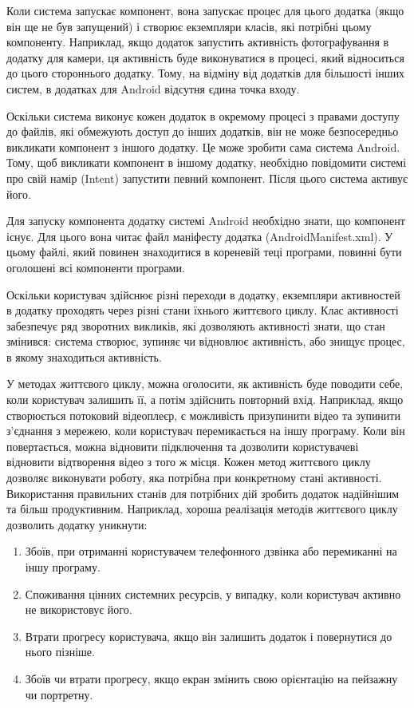 \documentclass[../main.tex]{subfiles}
\begin{document}
Коли система запускає компонент, вона запускає процес для цього додатка (якщо він ще не був запущений) і створює екземпляри класів, які потрібні цьому компоненту. Наприклад, якщо додаток запустить активність фотографування в додатку для камери, ця активність буде виконуватися в процесі, який відноситься до цього стороннього додатку. Тому, на відміну від додатків для більшості інших систем, в додатках для Android відсутня єдина точка входу.

Оскільки система виконує кожен додаток в окремому процесі з правами доступу до файлів, які обмежують доступ до інших додатків, він не може безпосередньо викликати компонент з іншого додатку. Це може зробити сама система Android. Тому, щоб викликати компонент в іншому додатку, необхідно повідомити системі про свій намір (Intent) запустити певний компонент. Після цього система активує його.

Для запуску компонента додатку системі Android необхідно знати, що компонент існує. Для цього вона читає файл маніфесту додатка (AndroidManifest.xml). У цьому файлі, який повинен знаходитися в кореневій теці програми, повинні бути оголошені всі компоненти програми.

Оскільки користувач здійснює різні переходи в додатку, екземпляри активностей в додатку проходять через різні стани їхнього життєвого циклу. Клас активності забезпечує ряд зворотних викликів, які дозволяють активності знати, що стан змінився: система створює, зупиняє чи відновлює активність, або знищує процес, в якому знаходиться активність.

У методах життєвого циклу, можна оголосити, як активність буде поводити себе, коли користувач залишить її, а потім здійснить повторний вхід. Наприклад, якщо створюється потоковий відеоплеєр, є можливість призупинити відео та зупинити з'єднання з мережею, коли користувач перемикається на іншу програму. Коли він повертається, можна відновити підключення та дозволити користувачеві відновити відтворення відео з того ж місця. Кожен метод життєвого циклу дозволяє виконувати роботу, яка потрібна при конкретному стані активності. Використання правильних станів для потрібних дій зробить додаток надійнішим та більш продуктивним. Наприклад, хороша реалізація методів життєвого циклу дозволить додатку уникнути:

\begin{enumerate}
	\item Збоїв, при отриманні користувачем телефонного дзвінка або перемиканні на іншу програму.
	\item Споживання цінних системних ресурсів, у випадку, коли користувач активно не використовує його.
	\item Втрати прогресу користувача, якщо він залишить додаток і повернутися до нього пізніше.
	\item Збоїв чи втрати прогресу, якщо екран змінить свою орієнтацію на пейзажну чи портретну.
\end{enumerate}
\end{document}
